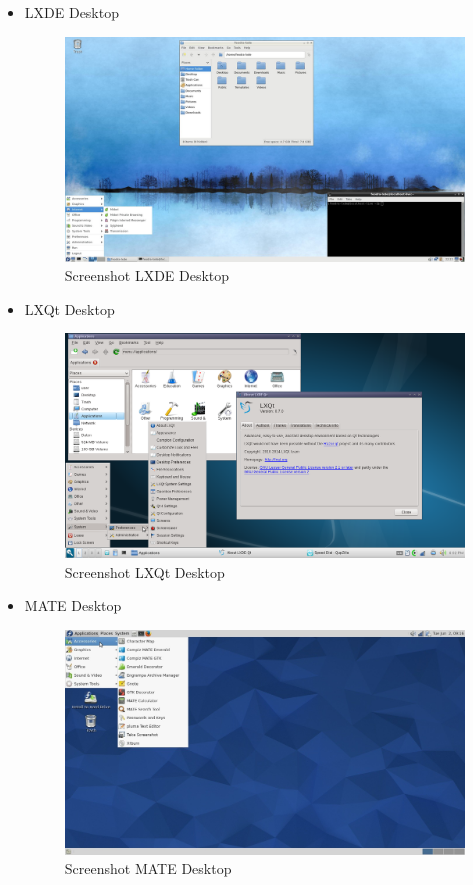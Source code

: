\documentclass[12pt,]{article}
\begin{document}
\begin{itemize}
		\item LXDE Desktop
		\begin{figure}[H]
			\centering
			\includegraphics[width=0.8\linewidth]{images/vbox_de/lxde}
			\caption{Screenshot LXDE Desktop}
		\end{figure}

		\item LXQt Desktop
		\begin{figure}[H]
			\centering
			\includegraphics[width=0.8\linewidth]{images/vbox_de/lxqt}
			\caption{Screenshot LXQt Desktop}
		\end{figure}

		\item MATE Desktop
		\begin{figure}[H]
			\centering
			\includegraphics[width=0.8\linewidth]{images/vbox_de/mate}
			\caption{Screenshot MATE Desktop}
		\end{figure}


\end{itemize}
\end{document}
